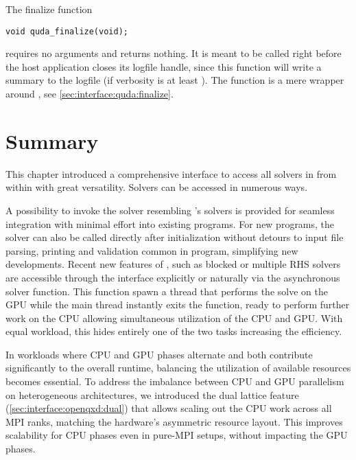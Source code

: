 
The finalize function
\begin{verbatim}
void quda_finalize(void);
\end{verbatim}
requires no arguments and returns nothing.
It is meant to be called right before the host application closes its logfile handle, since this function will write a summary to the logfile (if verbosity is at least ).
The function is a mere wrapper around , see \cref{sec:interface:quda:finalize}.

\section{Summary}
\label{sec:interface:summary}


This chapter introduced a comprehensive interface to access all solvers in \quda from within \openqxd with great versatility.
Solvers can be accessed in numerous ways.%

A possibility to invoke the solver resembling \openqxd's solvers is provided for seamless integration with minimal effort into existing programs.
For new programs, the solver can also be called directly after initialization without detours to input file parsing, printing and validation common in \openqxd program, simplifying new developments.
Recent new features of \quda, such as blocked or multiple RHS solvers are accessible through the interface explicitly or naturally via the asynchronous solver function.
This function spawn a thread that performs the solve on the GPU while the main thread instantly exits the function, ready to perform further work on the CPU allowing simultaneous utilization of the CPU and GPU.
With equal workload, this hides entirely one of the two tasks increasing the efficiency.

In workloads where CPU and GPU phases alternate and both contribute significantly to the overall runtime, balancing the utilization of available resources becomes essential.
To address the imbalance between CPU and GPU parallelism on heterogeneous architectures, we introduced the dual lattice feature (\cref{sec:interface:openqxd:dual}) that allows scaling out the CPU work across all MPI ranks, matching the hardware's asymmetric resource layout.
This improves scalability for CPU phases even in pure-MPI setups, without impacting the GPU phases.

